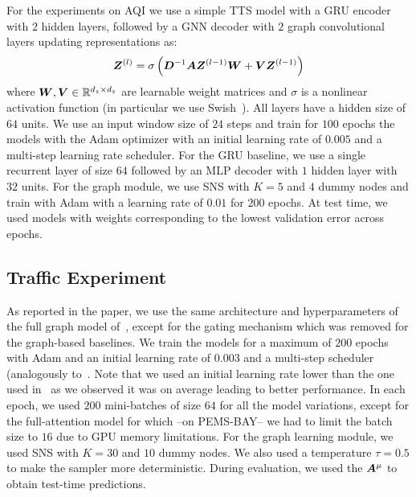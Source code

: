 For the experiments on AQI we use a simple TTS model with a GRU encoder with $2$ hidden layers, followed by a GNN decoder with $2$ graph convolutional layers updating representations as:
\begin{equation}
    {\bm{Z}}^{(l)} = \sigma\left({\bm{D}}^{-1} {\bm{A}} {\bm{Z}}^{(l-1)}{\bm{W}} + {\bm{V}} {\bm{Z}}^{(l-1)}\right)
\end{equation}
where ${\bm{W}},{\bm{V}} \in {\mathbb{R}}^{d_z \times d_z}$ are learnable weight matrices and $\sigma$ is a nonlinear activation function (in particular we use Swish~\citep{ramachandran2017searching}). All layers have a hidden size of $64$ units. We use an input window size of $24$ steps and train for $100$ epochs the models with the Adam optimizer with an initial learning rate of $0.005$ and a multi-step learning rate scheduler. For the GRU baseline, we use a single recurrent layer of size $64$ followed by an MLP decoder with $1$ hidden layer with $32$ units. For the graph module, we use SNS with $K=5$ and $4$ dummy nodes and train with Adam with a learning rate of $0.01$ for $200$ epochs. At test time, we used models with weights corresponding to the lowest validation error across epochs.

\subsection{Traffic Experiment} 

As reported in the paper, we use the same architecture and hyperparameters of the full graph model of~\citet{satorras2022multivariate}, except for the gating mechanism which was removed for the graph-based baselines. We train the models for a maximum of $200$ epochs with Adam and an initial learning rate of $0.003$ and a multi-step scheduler (analogously to~\citet{satorras2022multivariate}. Note that we used an initial learning rate lower than the one used in~\citep{satorras2022multivariate} as we observed it was on average leading to better performance. 
In each epoch, we used $200$ mini-batches of size $64$ for all the model variations, except for the full-attention model for which --on PEMS-BAY-- we had to limit the batch size to $16$ due to GPU memory limitations. For the graph learning module, we used SNS with $K=30$ and $10$ dummy nodes. We also used a temperature $\tau=0.5$ to make the sampler more deterministic. During evaluation, we used the ${\bm{A}}^\mu$ to obtain test-time predictions.
